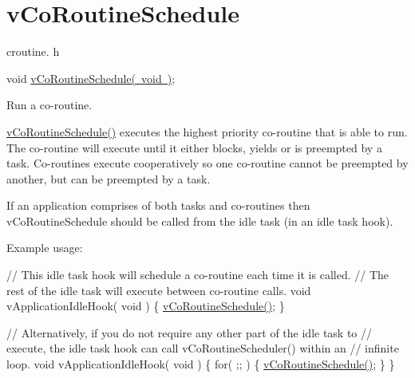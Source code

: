 \hypertarget{group__v_co_routine_schedule}{}\section{v\+Co\+Routine\+Schedule}
\label{group__v_co_routine_schedule}
croutine. h 
\begin{DoxyPre}
void \mbox{\hyperlink{croutine_8h_a5333c649a2c063006ca3cd7a3b5b9240}{vCoRoutineSchedule( void )}};\end{DoxyPre}


Run a co-\/routine.

\mbox{\hyperlink{croutine_8h_a5333c649a2c063006ca3cd7a3b5b9240}{v\+Co\+Routine\+Schedule()}} executes the highest priority co-\/routine that is able to run. The co-\/routine will execute until it either blocks, yields or is preempted by a task. Co-\/routines execute cooperatively so one co-\/routine cannot be preempted by another, but can be preempted by a task.

If an application comprises of both tasks and co-\/routines then v\+Co\+Routine\+Schedule should be called from the idle task (in an idle task hook).

Example usage\+: 
\begin{DoxyPre}
// This idle task hook will schedule a co-routine each time it is called.
// The rest of the idle task will execute between co-routine calls.
void vApplicationIdleHook( void )
\{
   \mbox{\hyperlink{croutine_8h_a5333c649a2c063006ca3cd7a3b5b9240}{vCoRoutineSchedule()}};
\}\end{DoxyPre}



\begin{DoxyPre}// Alternatively, if you do not require any other part of the idle task to
// execute, the idle task hook can call vCoRoutineScheduler() within an
// infinite loop.
void vApplicationIdleHook( void )
\{
   for( ;; )
   \{
       \mbox{\hyperlink{croutine_8h_a5333c649a2c063006ca3cd7a3b5b9240}{vCoRoutineSchedule()}};
   \}
\}
\end{DoxyPre}
 